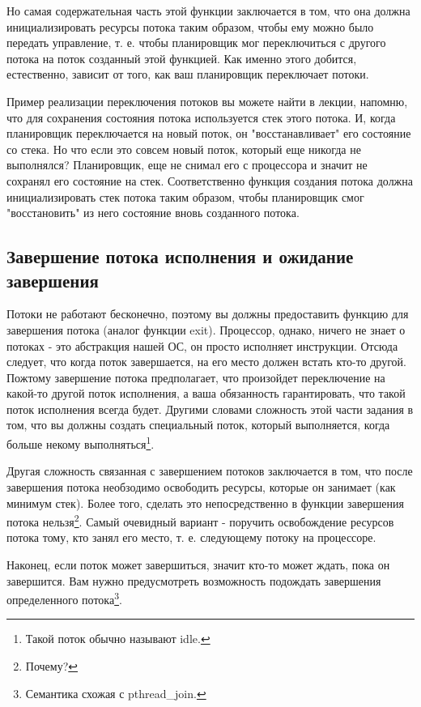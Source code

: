 Но самая содержательная часть этой функции заключается в том, что она должна
инициализировать ресурсы потока таким образом, чтобы ему можно было передать
управление, т. е. чтобы планировщик мог переключиться с другого потока на поток
созданный этой функцией. Как именно этого добится, естественно, зависит от того,
как ваш планировщик переключает потоки.

Пример реализации переключения потоков вы можете найти в лекции, напомню, что
для сохранения состояния потока используется стек этого потока. И, когда
планировщик переключается на новый поток, он "восстанавливает" его состояние со
стека. Но что если это совсем новый поток, который еще никогда не выполнялся?
Планировщик, еще не снимал его с процессора и значит не сохранял его состояние
на стек. Соответственно функция создания потока должна инициализировать стек
потока таким образом, чтобы планировщик смог "восстановить" из него состояние
вновь созданного потока.

\subsection{Завершение потока исполнения и ожидание завершения}

Потоки не работают бесконечно, поэтому вы должны предоставить функцию для
завершения потока (аналог функции exit). Процессор, однако, ничего не знает
о потоках - это абстракция нашей ОС, он просто исполняет инструкции. Отсюда
следует, что когда поток завершается, на его место должен встать кто-то другой.
Пожтому завершение потока предполагает, что произойдет переключение на какой-то
другой поток исполнения, а ваша обязанность гарантировать, что такой поток
исполнения всегда будет. Другими словами сложность этой части задания в том,
что вы должны создать специальный поток, который выполняется, когда больше
некому выполняться\footnote{Такой поток обычно называют idle.}.

Другая сложность связанная с завершением потоков заключается в том, что после
завершения потока необзодимо освободить ресурсы, которые он занимает (как
минимум стек). Более того, сделать это непосредственно в функции завершения
потока нельзя\footnote{Почему?}. Самый очевидный вариант - поручить освобождение
ресурсов потока тому, кто занял его место, т. е. следующему потоку на
процессоре.

Наконец, если поток может завершиться, значит кто-то может ждать, пока он
завершится. Вам нужно предусмотреть возможность подождать завершения
определенного потока\footnote{Семантика схожая с pthread\_join.}.
